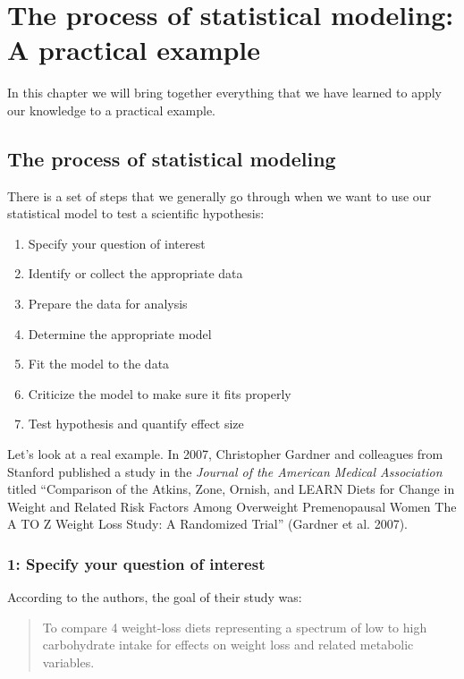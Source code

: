 \documentclass[]{book}
\providecommand{\tightlist}{%
  \setlength{\itemsep}{0pt}\setlength{\parskip}{0pt}}
\theoremstyle{definition}
\theoremstyle{definition}
\theoremstyle{definition}
\theoremstyle{remark}
\begin{document}
\chapter{The process of statistical modeling: A practical
example}\label{practical-example}

In this chapter we will bring together everything that we have learned
to apply our knowledge to a practical example.

\section{The process of statistical
modeling}\label{the-process-of-statistical-modeling}

There is a set of steps that we generally go through when we want to use
our statistical model to test a scientific hypothesis:

\begin{enumerate}
\def\labelenumi{\arabic{enumi}.}
\tightlist
\item
  Specify your question of interest
\item
  Identify or collect the appropriate data
\item
  Prepare the data for analysis
\item
  Determine the appropriate model
\item
  Fit the model to the data
\item
  Criticize the model to make sure it fits properly
\item
  Test hypothesis and quantify effect size
\end{enumerate}

Let's look at a real example. In 2007, Christopher Gardner and
colleagues from Stanford published a study in the \emph{Journal of the
American Medical Association} titled ``Comparison of the Atkins, Zone,
Ornish, and LEARN Diets for Change in Weight and Related Risk Factors
Among Overweight Premenopausal Women The A TO Z Weight Loss Study: A
Randomized Trial'' (Gardner et al. 2007).

\subsection{1: Specify your question of
interest}\label{specify-your-question-of-interest}

According to the authors, the goal of their study was:

\begin{quote}
To compare 4 weight-loss diets representing a spectrum of low to high
carbohydrate intake for effects on weight loss and related metabolic
variables.
\end{quote}
\end{document}

